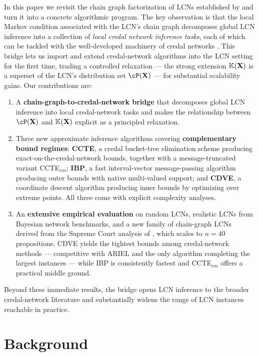 \documentclass{article}
\newcommand{\kr}[1]{\mathbb{K}\!\left( #1 \right)}
\begin{document}
In this paper we revisit the chain graph factorization of LCNs established by \cite{cozman23a} and turn it into a concrete algorithmic program. The key observation is that the local Markov condition associated with the LCN's chain graph decomposes global LCN inference into a collection of \emph{local credal network inference tasks}, each of which can be tackled with the well-developed machinery of credal networks \cite{cozman2000credal,maua2020ijar,l2u,antonucci2015approxlp}. This bridge lets us import and extend credal-network algorithms into the LCN setting for the first time, trading a controlled relaxation --- the strong extension $\kr{\bX}$ is a superset of the LCN's distribution set $\cP(\bX)$ --- for substantial scalability gains. Our contributions are:
\begin{enumerate}
    \item A \textbf{chain-graph-to-credal-network bridge} that decomposes global LCN inference into local credal-network tasks and makes the relationship between $\cP(\bX)$ and $\kr{\bX}$ explicit as a principled relaxation.
    \item Three new approximate inference algorithms covering \textbf{complementary bound regimes}: \textbf{CCTE}, a credal bucket-tree elimination scheme producing exact-on-the-credal-network bounds, together with a message-truncated variant CCTE$_{cm}$; \textbf{IBP}, a fast interval-vector message-passing algorithm producing outer bounds with native multi-valued support; and \textbf{CDVE}, a coordinate descent algorithm producing inner bounds by optimizing over extreme points. All three come with explicit complexity analyses.
    \item An \textbf{extensive empirical evaluation} on random LCNs, realistic LCNs from Bayesian network benchmarks, and a new family of chain-graph LCNs derived from the Supreme Court analysis of \cite{ogburn2020causal}, which scales to $n{=}40$ propositions. CDVE yields the tightest bounds among credal-network methods --- competitive with ARIEL and the only algorithm completing the largest instances --- while IBP is consistently fastest and CCTE$_{cm}$ offers a practical middle ground.
\end{enumerate}
Beyond these immediate results, the bridge opens LCN inference to the broader credal-network literature and substantially widens the range of LCN instances reachable in practice.

\section{Background}
\label{sec-background}
\end{document}

